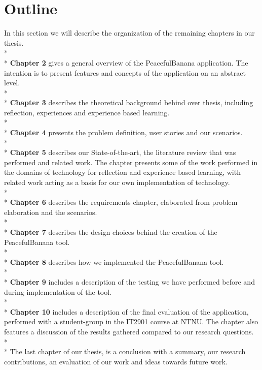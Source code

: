 \section{Outline}
In this section we will describe the organization of the remaining chapters in our thesis. 
\\*
\\*
\textbf{Chapter 2} gives a general overview of the PeacefulBanana application. The intention is to present features and concepts of the application on an abstract level.
\\*
\\*
\textbf{Chapter 3} describes the theoretical background behind over thesis, including reflection, experiences and experience based learning. 
\\*
\\*
\textbf{Chapter 4} presents the problem definition, user stories and our scenarios. 
\\*
\\*
\textbf{Chapter 5} describes our State-of-the-art, the literature review that was performed and related work. The chapter presents some of the work performed in the domains of technology for reflection and experience based learning, with related work acting as a basis for our own implementation of technology. 
\\*
\\*
\textbf{Chapter 6} describes the requirements chapter, elaborated from problem elaboration and the scenarios. 
\\*
\\*
\textbf{Chapter 7} describes the design choices behind the creation of the PeacefulBanana tool.
\\*
\\*
\textbf{Chapter 8} describes how we implemented the PeacefulBanana tool. 
\\*
\\*
\textbf{Chapter 9} includes a description of the testing we have performed before and during implementation of the tool. 
\\*
\\*
\textbf{Chapter 10} includes a description of the final evaluation of the application, performed with a student-group in the IT2901 course at NTNU. The chapter also features a discussion of the results gathered compared to our research questions. 
\\*
\\*
The last chapter of our thesis, is a conclusion with a summary, our research contributions, an evaluation of our work and ideas towards future work.